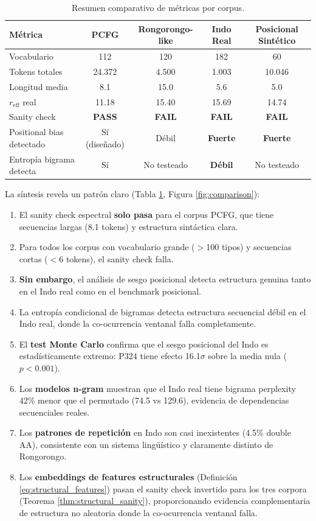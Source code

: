 \documentclass[11pt,a4paper]{article}
\newcommand{\1}{\mathbf{1}}
\numberwithin{equation}{section}
\begin{document}
\begin{table}[h]
\centering
\caption{Resumen comparativo de métricas por corpus.}
\label{tab:summary}
\begin{tabular}{lcccc}
\toprule
Métrica & PCFG & Rongorongo-like & Indo Real & Posicional Sintético \\
\midrule
Vocabulario & 112 & 120 & 182 & 60 \\
Tokens totales & 24.372 & 4.500 & 1.003 & 10.046 \\
Longitud media & 8.1 & 15.0 & 5.6 & 5.0 \\
$r_{\text{eff}}$ real & 11.18 & 15.40 & 15.69 & 14.74 \\
Sanity check & \textbf{PASS} & \textbf{FAIL} & \textbf{FAIL} & \textbf{FAIL} \\
Positional bias detectado & Sí (diseñado) & Débil & \textbf{Fuerte} & \textbf{Fuerte} \\
Entropía bigrama detecta & Sí & No testeado & \textbf{Débil} & No testeado \\
\bottomrule
\end{tabular}
\end{table}

La síntesis revela un patrón claro (Tabla \ref{tab:summary}, Figura \ref{fig:comparison}):
\begin{enumerate}
\item El sanity check espectral \textbf{solo pasa} para el corpus PCFG, que tiene secuencias largas (8.1 tokens) y estructura sintáctica clara.
    \item Para todos los corpus con vocabulario grande ($>$100 tipos) y secuencias cortas ($<$6 tokens), el sanity check falla.
    \item \textbf{Sin embargo}, el análisis de sesgo posicional detecta estructura genuina tanto en el Indo real como en el benchmark posicional.
    \item La entropía condicional de bigramas detecta estructura secuencial débil en el Indo real, donde la co-ocurrencia ventanal falla completamente.
    \item El \textbf{test Monte Carlo} confirma que el sesgo posicional del Indo es estadísticamente extremo: P324 tiene efecto 16.1$\sigma$ sobre la media nula ($p<0.001$).
    \item Los \textbf{modelos n-gram} muestran que el Indo real tiene bigrama perplexity 42\% menor que el permutado (74.5 vs 129.6), evidencia de dependencias secuenciales reales.
    \item Los \textbf{patrones de repetición} en Indo son casi inexistentes (4.5\% double AA), consistente con un sistema lingüístico y claramente distinto de Rongorongo.
    \item Los \textbf{embeddings de features estructurales} (Definición \ref{eq:structural_features}) pasan el sanity check invertido para los tres corpora (Teorema \ref{thm:structural_sanity}), proporcionando evidencia complementaria de estructura no aleatoria donde la co-ocurrencia ventanal falla.
\end{enumerate}
\end{document}
